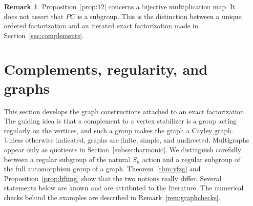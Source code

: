 \documentclass[12pt,letterpaper]{article}
\numberwithin{equation}{section}
\theoremstyle{definition}
\newtheorem{remark}[theorem]{Remark}
\begin{document}
\begin{remark}
Proposition~\ref{prop:12} concerns a bijective multiplication map. It does not assert that $PC$ is a subgroup. This is the distinction between a unique ordered factorization and an iterated exact factorization made in Section~\ref{sec:complements}.
\end{remark}

\section{Complements, regularity, and graphs}\label{sec:graphs}
This section develops the graph constructions attached to an exact factorization. The guiding idea is that a complement to a vertex stabilizer is a group acting regularly on the vertices, and such a group makes the graph a Cayley graph. Unless otherwise indicated, graphs are finite, simple, and undirected. Multigraphs appear only as quotients in Section~\ref{subsec:harmonic}. We distinguish carefully between a regular subgroup of the natural $S_n$ action and a regular subgroup of the full automorphism group of a graph. Theorem~\ref{thm:yfzg} and Proposition~\ref{prop:lifting} show that the two notions really differ. Several statements below are known and are attributed to the literature. The numerical checks behind the examples are described in Remark~\ref{rem:graphchecks}.
\end{document}
